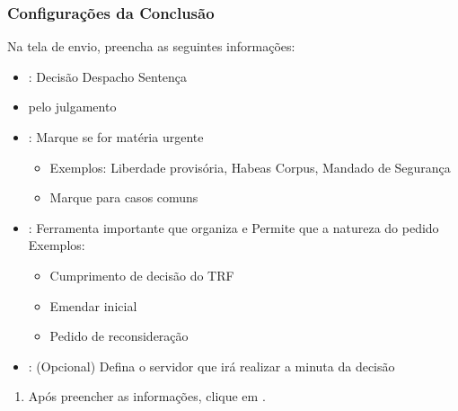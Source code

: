 \documentclass[letterpaper,10pt,brazil]{sphinxmanual}
\begin{document}
\subsubsection{Configurações da Conclusão}
\label{\detokenize{projud_35_enviarconcluso:configuracoes-da-conclusao}}
\sphinxAtStartPar
Na tela de envio, preencha as seguintes informações:
\begin{itemize}
\item {} 
\sphinxAtStartPar
{}:
\sphinxhyphen{} Decisão
\sphinxhyphen{} Despacho
\sphinxhyphen{} Sentença

\item {} 
\sphinxAtStartPar
{} pelo julgamento

\item {} 
\sphinxAtStartPar
{}:
\sphinxhyphen{} Marque  se for matéria urgente
\begin{itemize}
\item {} 
\sphinxAtStartPar
Exemplos: Liberdade provisória, Habeas Corpus, Mandado de Segurança

\end{itemize}
\begin{itemize}
\item {} 
\sphinxAtStartPar
Marque  para casos comuns

\end{itemize}

\item {} 
\sphinxAtStartPar
{}:
\sphinxhyphen{} Ferramenta importante que organiza e 
\sphinxhyphen{} Permite que  a natureza do pedido
\sphinxhyphen{} Exemplos:
\begin{itemize}
\item {} 
\sphinxAtStartPar
Cumprimento de decisão do TRF

\item {} 
\sphinxAtStartPar
Emendar inicial

\item {} 
\sphinxAtStartPar
Pedido de reconsideração

\end{itemize}

\item {} 
\sphinxAtStartPar
{}:
\sphinxhyphen{} (Opcional) Defina o servidor que irá realizar a minuta da decisão

\end{itemize}
\begin{enumerate}
%
\setcounter{enumi}{5}
\item {} 
\sphinxAtStartPar
Após preencher as informações, clique em .

\end{enumerate}
\end{document}
